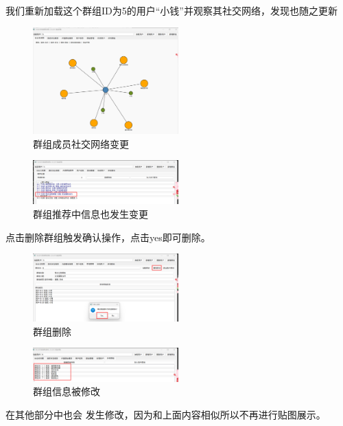 \documentclass[12pt,a4paper]{article}
\begin{document}
我们重新加载这个群组ID为5的用户“小钱”并观察其社交网络，发现也随之更新

\begin{figure}[H]
    \centering
    \includegraphics[width=0.5\textwidth]{pt2-36.png}
    \caption{群组成员社交网络变更}
\end{figure}

\begin{figure}[H]
    \centering
    \includegraphics[width=0.5\textwidth]{pt2-37.png}
    \caption{群组推荐中信息也发生变更}
\end{figure}

点击删除群组触发确认操作，点击yes即可删除。

\begin{figure}[H]
    \centering
    \includegraphics[width=0.5\textwidth]{pt2-38.png}
    \caption{群组删除}
\end{figure}

\begin{figure}[H]
    \centering
    \includegraphics[width=0.5\textwidth]{pt2-39.png}
    \caption{群组信息被修改}
\end{figure}

在其他部分中也会 发生修改，因为和上面内容相似所以不再进行贴图展示。
\end{document}

